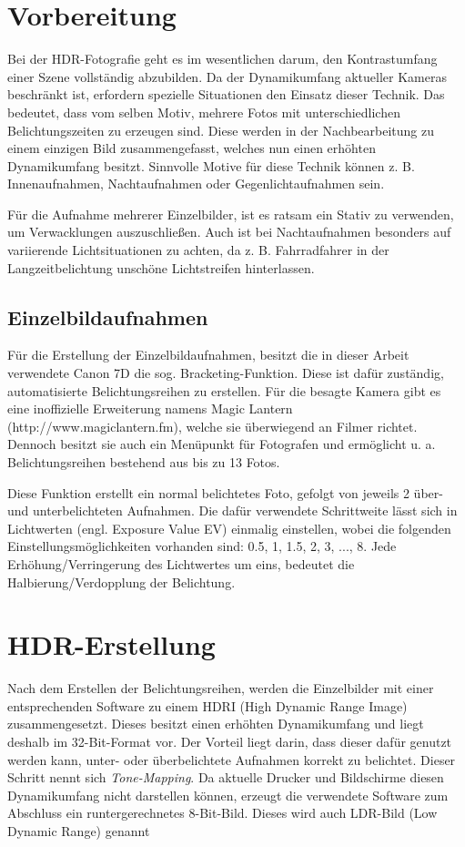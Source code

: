 \documentclass[liststotoc,bibtotoc,fontsize=14pt,]{scrreprt}
\begin{document}
	\chapter{Vorbereitung}
		Bei der HDR-Fotografie geht es im wesentlichen darum, den Kontrastumfang einer Szene vollständig abzubilden. Da der Dynamikumfang aktueller Kameras beschränkt ist, erfordern spezielle Situationen den Einsatz dieser Technik. Das bedeutet, dass vom selben Motiv, mehrere Fotos mit unterschiedlichen Belichtungszeiten zu erzeugen sind. Diese werden in der Nachbearbeitung zu einem einzigen Bild zusammengefasst, welches nun einen erhöhten Dynamikumfang besitzt. Sinnvolle Motive für diese Technik können z. B. Innenaufnahmen, Nachtaufnahmen oder Gegenlichtaufnahmen sein.
		
		\bigskip
		Für die Aufnahme mehrerer Einzelbilder, ist es ratsam ein Stativ zu verwenden, um Verwacklungen auszuschließen. Auch ist bei Nachtaufnahmen besonders auf variierende Lichtsituationen zu achten, da z. B. Fahrradfahrer in der Langzeitbelichtung unschöne Lichtstreifen hinterlassen.
	
	\section{Einzelbildaufnahmen}
	\label{sec:einzel}
		Für die Erstellung der Einzelbildaufnahmen, besitzt die in dieser Arbeit verwendete Canon 7D die sog. Bracketing-Funktion. Diese ist dafür zuständig, automatisierte Belichtungsreihen zu erstellen. Für die besagte Kamera gibt es eine inoffizielle Erweiterung namens \grqq{}Magic Lantern\grqq{} (http://www.magiclantern.fm), welche sie überwiegend an Filmer richtet. Dennoch besitzt sie auch ein Menüpunkt für Fotografen und ermöglicht u. a. Belichtungsreihen bestehend aus bis zu 13 Fotos.
		
		\bigskip
		Diese Funktion erstellt ein normal belichtetes Foto, gefolgt von jeweils 2 über- und unterbelichteten Aufnahmen. Die dafür verwendete Schrittweite lässt sich in Lichtwerten (engl. Exposure Value EV) einmalig einstellen, wobei die folgenden Einstellungsmöglichkeiten vorhanden sind: 0.5, 1, 1.5, 2, 3, ..., 8. Jede Erhöhung/Verringerung des Lichtwertes um eins, bedeutet die Halbierung/Verdopplung der Belichtung. 


	\chapter{HDR-Erstellung}
	\label{ch:processing}
		Nach dem Erstellen der Belichtungsreihen, werden die Einzelbilder mit einer entsprechenden Software zu einem HDRI (High Dynamic Range Image) zusammengesetzt. Dieses besitzt einen erhöhten Dynamikumfang und liegt deshalb im 32-Bit-Format vor. Der Vorteil liegt darin, dass dieser dafür genutzt werden kann, unter- oder überbelichtete Aufnahmen korrekt zu belichtet. Dieser Schritt nennt sich \textit{Tone-Mapping}.
		Da aktuelle Drucker und Bildschirme diesen Dynamikumfang nicht darstellen können, erzeugt die verwendete Software zum Abschluss ein runtergerechnetes 8-Bit-Bild. Dieses wird auch LDR-Bild (Low Dynamic Range) genannt 
		
\end{document}

